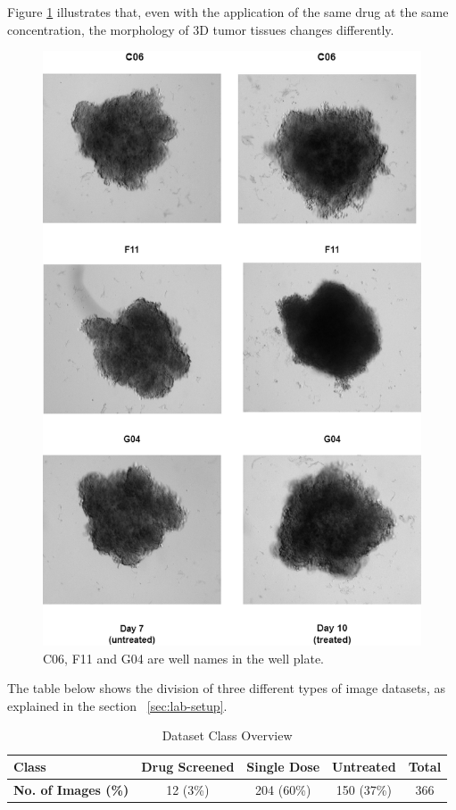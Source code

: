 Figure \ref{fig:Transition} illustrates that, even with the application of the same drug at the same concentration, the morphology of 3D tumor tissues changes differently.
\begin{figure}[H]
  \centering
  \includegraphics[scale=0.46]{figures/transition.png} 
  \caption{C06, F11 and G04 are well names in the well plate.}
  \label{fig:Transition}
\end{figure}



The table below shows the division of three different types of image datasets, as  explained in the section ~\ref{sec:lab-setup}.
\begin{table}[ht!]
  \centering
  \begin{tabular}{|l|c|c|c|c|}
  \hline
  \textbf{Class} & \textbf{Drug Screened} & \textbf{Single Dose} & \textbf{Untreated} & \textbf{Total} \\ \hline
  \textbf{No. of Images (\%)}  & 12 (3\%) & 204 (60\%) & 150 (37\%) & 366 \\ \hline
  \end{tabular}
  \caption{Dataset Class Overview}
  \label{tab:dataset}
\end{table}

